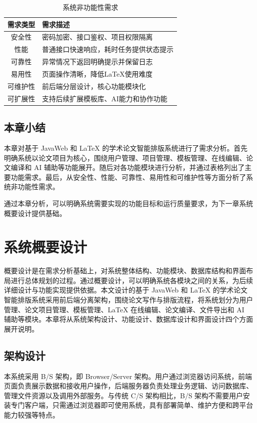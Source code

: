 \documentclass{xduugthesis}
\begin{document}
\begin{table}[H]
    \centering
    \caption{系统非功能性需求}
    \label{tab:non-functional-requirement}
    \begin{tabular}{|c|p{9cm}|}
        \hline
        需求类型 & 需求描述 \\
        \hline
        安全性 & 密码加密、接口鉴权、项目权限隔离 \\
        \hline
        性能 & 普通接口快速响应，耗时任务提供状态提示 \\
        \hline
        可靠性 & 异常情况下返回明确提示并保留日志 \\
        \hline
        易用性 & 页面操作清晰，降低LaTeX使用难度 \\
        \hline
        可维护性 & 前后端分层设计，核心功能模块化 \\
        \hline
        可扩展性 & 支持后续扩展模板库、AI能力和协作功能 \\
        \hline
    \end{tabular}
\end{table}

\section{本章小结}
本章对基于 JavaWeb 和 LaTeX 的学术论文智能排版系统进行了需求分析。首先明确系统以论文项目为核心，围绕用户管理、项目管理、模板管理、在线编辑、论文编译和 AI 辅助等功能展开。随后对各功能模块进行分析，并通过表格列出了主要功能需求。最后，从安全性、性能、可靠性、易用性和可维护性等方面分析了系统非功能性需求。

通过本章分析，可以明确系统需要实现的功能目标和运行质量要求，为下一章系统概要设计提供基础。

\chapter{系统概要设计}
概要设计是在需求分析基础上，对系统整体结构、功能模块、数据库结构和界面布局进行总体规划的过程。通过概要设计，可以明确系统各模块之间的关系，为后续详细设计与功能实现提供依据。本文设计的基于 JavaWeb 和 LaTeX 的学术论文智能排版系统采用前后端分离架构，围绕论文写作与排版流程，将系统划分为用户管理、论文项目管理、模板管理、LaTeX 在线编辑、论文编译、文件导出和 AI 辅助等模块。本章将从系统架构设计、功能设计、数据库设计和界面设计四个方面展开说明。

\section{架构设计}
本系统采用 B/S 架构，即 Browser/Server 架构。用户通过浏览器访问系统，前端页面负责展示数据和接收用户操作，后端服务器负责处理业务逻辑、访问数据库、管理文件资源以及调用外部服务。与传统 C/S 架构相比，B/S 架构不需要用户安装专门客户端，只需通过浏览器即可使用系统，具有部署简单、维护方便和跨平台能力较强等特点。
\end{document}
